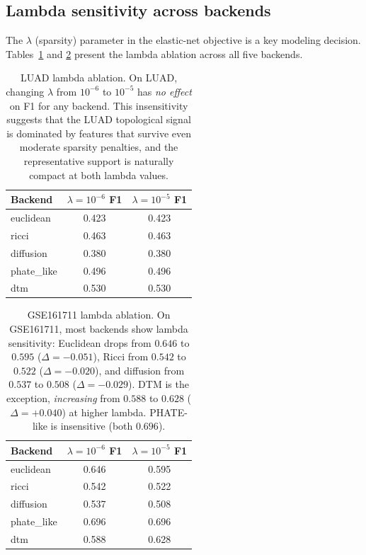 \documentclass[11pt]{article}
\begin{document}
\subsection{Lambda sensitivity across backends}

The $\lambda$ (sparsity) parameter in the elastic-net objective is a key modeling decision.
Tables~\ref{tab:lambda_luad} and \ref{tab:lambda_gse} present the lambda ablation across all five backends.

\begin{table}[h]
\centering
\small
\begin{tabular}{lcc}
\toprule
Backend & $\lambda = 10^{-6}$ F1 & $\lambda = 10^{-5}$ F1 \\
\midrule
euclidean & 0.423 & 0.423 \\
ricci & 0.463 & 0.463 \\
diffusion & 0.380 & 0.380 \\
phate\_like & 0.496 & 0.496 \\
dtm & 0.530 & 0.530 \\
\bottomrule
\end{tabular}
\caption{LUAD lambda ablation.
On LUAD, changing $\lambda$ from $10^{-6}$ to $10^{-5}$ has \emph{no effect} on F1 for any backend.
This insensitivity suggests that the LUAD topological signal is dominated by features that survive even moderate sparsity penalties, and the representative support is naturally compact at both lambda values.}
\label{tab:lambda_luad}
\end{table}

\begin{table}[h]
\centering
\small
\begin{tabular}{lcc}
\toprule
Backend & $\lambda = 10^{-6}$ F1 & $\lambda = 10^{-5}$ F1 \\
\midrule
euclidean & 0.646 & 0.595 \\
ricci & 0.542 & 0.522 \\
diffusion & 0.537 & 0.508 \\
phate\_like & 0.696 & 0.696 \\
dtm & 0.588 & 0.628 \\
\bottomrule
\end{tabular}
\caption{GSE161711 lambda ablation.
On GSE161711, most backends show lambda sensitivity: Euclidean drops from $0.646$ to $0.595$ ($\Delta = -0.051$), Ricci from $0.542$ to $0.522$ ($\Delta = -0.020$), and diffusion from $0.537$ to $0.508$ ($\Delta = -0.029$).
DTM is the exception, \emph{increasing} from $0.588$ to $0.628$ ($\Delta = +0.040$) at higher lambda.
PHATE-like is insensitive (both $0.696$).}
\label{tab:lambda_gse}
\end{table}
\end{document}
